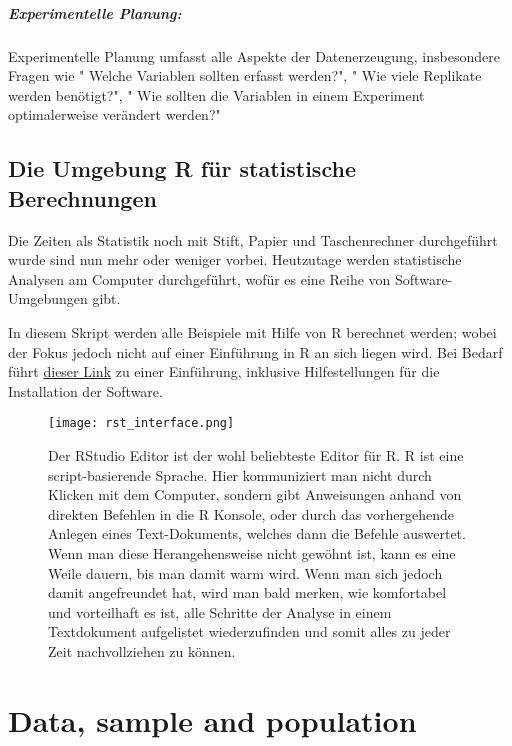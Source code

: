 \documentclass[a4paper,twoside]{tufte-book}\usepackage[]{graphicx}\usepackage[]{color}
\begin{document}
\paragraph{Experimentelle Planung:} Experimentelle Planung umfasst alle Aspekte der Datenerzeugung, insbesondere Fragen wie " Welche Variablen sollten erfasst werden?", " Wie viele Replikate werden benötigt?", " Wie sollten die Variablen in einem Experiment optimalerweise verändert werden?"


\section{Die Umgebung R für statistische Berechnungen}

Die Zeiten als Statistik noch mit Stift, Papier und Taschenrechner durchgeführt wurde sind nun mehr oder weniger vorbei. Heutzutage werden statistische Analysen am Computer durchgeführt, wofür es eine Reihe von Software-Umgebungen gibt.

In diesem Skript werden alle Beispiele mit Hilfe von R berechnet werden; wobei der Fokus jedoch nicht auf einer Einführung in R an sich liegen wird. Bei Bedarf führt  \href{http://biometry.github.io/APES/R/R10-gettingStarted.html}{dieser Link} zu einer Einführung, inklusive Hilfestellungen für die Installation der Software.

\begin{figure}[]
\begin{center}
\texttt{[image: rst\_interface.png]}
\caption{Der RStudio Editor ist der wohl beliebteste Editor für R. R ist eine script-basierende Sprache. Hier kommuniziert man nicht durch Klicken mit dem Computer, sondern gibt Anweisungen anhand von direkten Befehlen in die R Konsole, oder durch das vorhergehende Anlegen eines Text-Dokuments, welches dann die Befehle auswertet. Wenn man diese Herangehensweise nicht gewöhnt ist, kann es eine Weile dauern, bis man damit warm wird. Wenn man sich jedoch damit angefreundet hat, wird man bald merken, wie komfortabel und vorteilhaft es ist, alle Schritte der Analyse in einem Textdokument aufgelistet wiederzufinden und somit alles zu jeder Zeit nachvollziehen zu können.}
\label{fig: Rstudio}
\end{center}
\end{figure}



\chapter{Data, sample and population}
\end{document}
